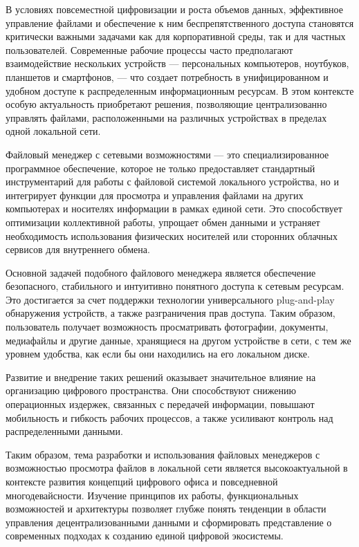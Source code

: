 \label{sec:intro}

В условиях повсеместной цифровизации и роста объемов данных, эффективное
управление файлами и обеспечение к ним беспрепятственного доступа становятся
критически важными задачами как для корпоративной среды, так и для частных
пользователей. Современные рабочие процессы часто предполагают взаимодействие
нескольких устройств — персональных компьютеров, ноутбуков, планшетов и смартфонов,
— что создает потребность в унифицированном и удобном доступе к распределенным
информационным ресурсам. В этом контексте особую актуальность приобретают решения,
позволяющие централизованно управлять файлами, расположенными на различных
устройствах в пределах одной локальной сети.

Файловый менеджер с сетевыми возможностями — это специализированное программное
обеспечение, которое не только предоставляет стандартный инструментарий для работы
с файловой системой локального устройства,
но и интегрирует функции для просмотра и управления файлами на других компьютерах
и носителях информации в рамках единой сети. Это способствует оптимизации коллективной
работы, упрощает обмен данными и устраняет необходимость
использования физических носителей или сторонних облачных сервисов для внутреннего
обмена.

Основной задачей подобного файлового менеджера является обеспечение безопасного,
стабильного и интуитивно понятного доступа к сетевым ресурсам. Это достигается
за счет поддержки технологии универсального plug-and-play обнаружения устройств,
а также разграничения прав доступа. Таким образом, пользователь получает возможность
просматривать фотографии, документы, медиафайлы и другие данные, хранящиеся на
другом устройстве в сети, с тем же уровнем удобства, как если бы они находились
на его локальном диске.

Развитие и внедрение таких решений оказывает значительное влияние на организацию
цифрового пространства. Они способствуют снижению операционных издержек, связанных
с передачей информации, повышают мобильность и гибкость рабочих процессов, а также
усиливают контроль над распределенными данными.

Таким образом, тема разработки и использования файловых менеджеров с возможностью
просмотра файлов в локальной сети является высокоактуальной в контексте развития
концепций цифрового офиса и повседневной многодевайсности. Изучение
принципов их работы, функциональных возможностей и архитектуры позволяет глубже
понять тенденции в области управления децентрализованными данными и сформировать
представление о современных подходах к созданию единой цифровой экосистемы.